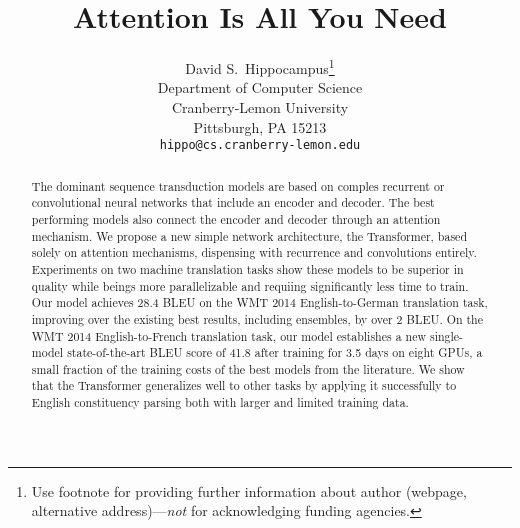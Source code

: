\documentclass{article}
\title{Attention Is All You Need}
\author{%
  David S.~Hippocampus\thanks{Use footnote for providing further information
    about author (webpage, alternative address)---\emph{not} for acknowledging
    funding agencies.} \\
  Department of Computer Science\\
  Cranberry-Lemon University\\
  Pittsburgh, PA 15213 \\
  \texttt{hippo@cs.cranberry-lemon.edu} \\
}
\begin{document}
\maketitle


\begin{abstract}
  The dominant sequence transduction models are based on comples recurrent or convolutional neural networks that include an encoder and decoder.
  The best performing models also connect the encoder and decoder through an attention mechanism.
  We propose a new simple network architecture, the Transformer, based solely on attention mechanisms, dispensing with recurrence and convolutions entirely.
  Experiments on two machine translation tasks show these models to be superior in quality while beings more parallelizable and requiing significantly less time to train.
  Our model achieves 28.4 BLEU on the WMT 2014 English-to-German translation task, improving over the existing best results, including ensembles, by over 2 BLEU.
  On the WMT 2014 English-to-French translation task, our model establishes a new single-model state-of-the-art BLEU score of 41.8 after training for 3.5 days on eight GPUs, a small fraction of the training costs of the best models from the literature.%
  We show that the Transformer generalizes well to other tasks by applying it successfully to English constituency parsing both with larger and limited training data.
\end{abstract}
\end{document}
